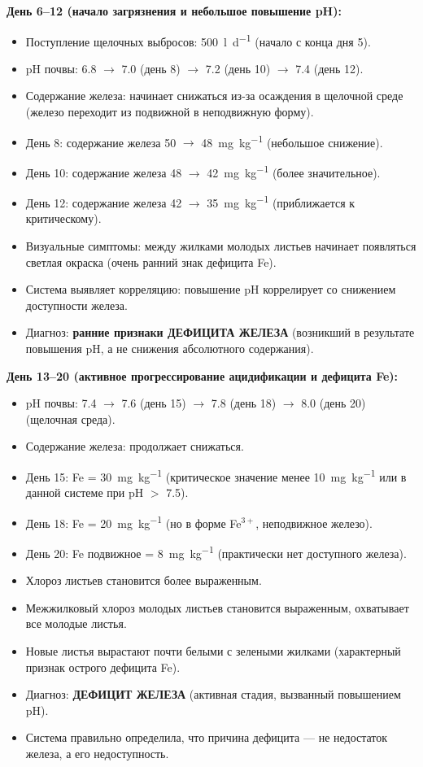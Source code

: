 \textbf{День 6--12 (начало загрязнения и небольшое повышение pH):}
\begin{itemize}
    \item Поступление щелочных выбросов: \SI{500}{\litre\per\day} (начало с конца дня \num{5}).
    \item pH почвы: \num{6.8} $\to$ \num{7.0} (день \num{8}) $\to$ \num{7.2} (день \num{10}) $\to$ \num{7.4} (день \num{12}).
    \item Содержание железа: начинает снижаться из-за осаждения в щелочной среде (железо переходит из подвижной в неподвижную форму).
    \item День 8: содержание железа \num{50} $\to$ \SI{48}{\milli\gram\per\kilogram} (небольшое снижение).
    \item День 10: содержание железа \num{48} $\to$ \SI{42}{\milli\gram\per\kilogram} (более значительное).
    \item День 12: содержание железа \num{42} $\to$ \SI{35}{\milli\gram\per\kilogram} (приближается к критическому).
    \item Визуальные симптомы: между жилками молодых листьев начинает появляться светлая окраска (очень ранний знак дефицита Fe).
    \item Система выявляет корреляцию: повышение pH коррелирует со снижением доступности железа.
    \item Диагноз: \textbf{ранние признаки ДЕФИЦИТА ЖЕЛЕЗА} (возникший в результате повышения pH, а не снижения абсолютного содержания).
\end{itemize}

\textbf{День 13--20 (активное прогрессирование ацидификации и дефицита Fe):}
\begin{itemize}
    \item pH почвы: \num{7.4} $\to$ \num{7.6} (день \num{15}) $\to$ \num{7.8} (день \num{18}) $\to$ \num{8.0} (день \num{20}) (щелочная среда).
    \item Содержание железа: продолжает снижаться.
    \item День 15: Fe = \SI{30}{\milli\gram\per\kilogram} (критическое значение менее \SI{10}{\milli\gram\per\kilogram} или в данной системе при pH $>$ \num{7.5}).
    \item День 18: Fe = \SI{20}{\milli\gram\per\kilogram} (но в форме Fe$^{3+}$, неподвижное железо).
    \item День 20: Fe подвижное = \SI{8}{\milli\gram\per\kilogram} (практически нет доступного железа).
    \item Хлороз листьев становится более выраженным.
    \item Межжилковый хлороз молодых листьев становится выраженным, охватывает все молодые листья.
    \item Новые листья вырастают почти белыми с зелеными жилками (характерный признак острого дефицита Fe).
    \item Диагноз: \textbf{ДЕФИЦИТ ЖЕЛЕЗА} (активная стадия, вызванный повышением pH).
    \item Система правильно определила, что причина дефицита --- не недостаток железа, а его недоступность.
\end{itemize}

